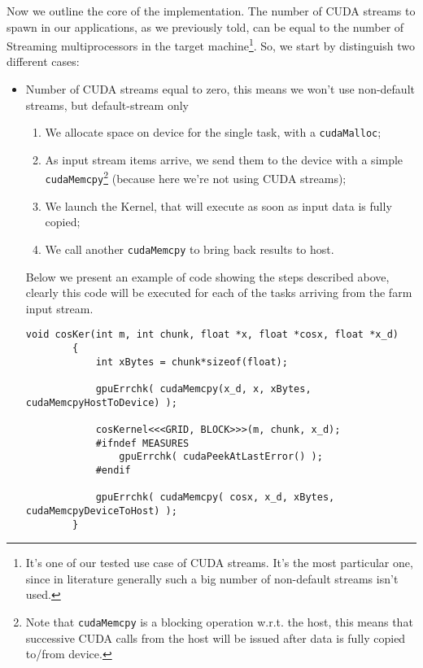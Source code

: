 	Now we outline the core of the implementation. The number of CUDA streams to spawn in our applications, as we previously told, can be equal to the number of Streaming multiprocessors in the target machine\footnote{It's one of our tested use case of CUDA streams. It's the most particular one, since in literature generally such a big number of non-default streams isn't used.}.
	So, we start by distinguish two different cases:
	\begin{itemize}
		\item Number of CUDA streams equal to zero, this means we won't use non-default streams, but default-stream only
		\begin{enumerate}
			\item We allocate space on device for the single task, with a \texttt{cudaMalloc};
			\item As input stream items arrive, we send them to the device with a simple \texttt{cudaMemcpy}\footnote{Note that \texttt{cudaMemcpy} is a blocking operation w.r.t. the host, this means that successive CUDA calls from the host will be issued after data is fully copied to/from device.} (because here we're not using CUDA streams);
			\item We launch the Kernel, that will execute as soon as input data is fully copied;
			\item We call another \texttt{cudaMemcpy} to bring back results to host.\\
		\end{enumerate}
		Below we present an example of code showing the steps described above, clearly this code will be executed for each of the tasks arriving from the farm input stream.\\
		\begin{lstlisting}[label=lst:noStr, caption={Data transfer host/device and kernel call, synchronous version}]
		void cosKer(int m, int chunk, float *x, float *cosx, float *x_d)
		{   
			int xBytes = chunk*sizeof(float);
			
			gpuErrchk( cudaMemcpy(x_d, x, xBytes, cudaMemcpyHostToDevice) ); 
			
			cosKernel<<<GRID, BLOCK>>>(m, chunk, x_d);
			#ifndef MEASURES
				gpuErrchk( cudaPeekAtLastError() );
			#endif   
			
			gpuErrchk( cudaMemcpy( cosx, x_d, xBytes, cudaMemcpyDeviceToHost) );
		}
		\end{lstlisting}
		

\end{itemize}
